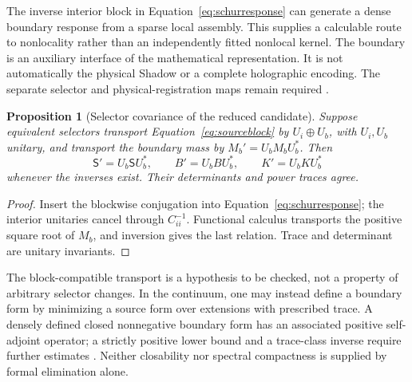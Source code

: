 \documentclass[11pt,letterpaper]{article}
\numberwithin{equation}{section}
\newtheorem{proposition}[theorem]{Proposition}
\theoremstyle{definition}
\theoremstyle{remark}
\begin{document}
The inverse interior block in Equation~\eqref{eq:schurresponse} can generate a dense boundary response from a sparse local assembly. This supplies a calculable route to nonlocality rather than an independently fitted nonlocal kernel. The boundary is an auxiliary interface of the mathematical representation. It is not automatically the physical Shadow or a complete holographic encoding. The separate selector and physical-registration maps remain required \cite{tcgsconservative,tcgsfoundation}.

\begin{proposition}[Selector covariance of the reduced candidate]
\label{prop:schurcovariance}
Suppose equivalent selectors transport Equation~\eqref{eq:sourceblock} by $U_i\oplus U_b$, with $U_i,U_b$ unitary, and transport the boundary mass by $M_b'=U_bM_bU_b^{*}$. Then
\begin{equation}
 \mathsf S'=U_b\mathsf S U_b^{*},\qquad
 B'=U_bBU_b^{*},\qquad K'=U_bKU_b^{*}
 \label{eq:schurnaturality}
\end{equation}
whenever the inverses exist. Their determinants and power traces agree.
\end{proposition}
\begin{proof}
Insert the blockwise conjugation into Equation~\eqref{eq:schurresponse}; the interior unitaries cancel through $C_{ii}^{-1}$. Functional calculus transports the positive square root of $M_b$, and inversion gives the last relation. Trace and determinant are unitary invariants.
\end{proof}

The block-compatible transport is a hypothesis to be checked, not a property of arbitrary selector changes. In the continuum, one may instead define a boundary form by minimizing a source form over extensions with prescribed trace. A densely defined closed nonnegative boundary form has an associated positive self-adjoint operator; a strictly positive lower bound and a trace-class inverse require further estimates \cite{reed}. Neither closability nor spectral compactness is supplied by formal elimination alone.
\end{document}
